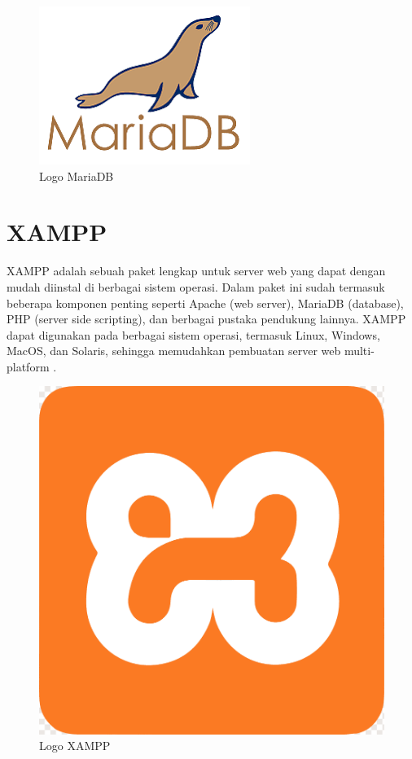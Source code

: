 \begin{figure}
	\centering
	\includegraphics[width=0.20\linewidth]{konten//gambar/logo-mariadb.png}
	\caption{Logo MariaDB}
	\label{fig:enter-label}
\end{figure}

\section{XAMPP}
XAMPP adalah sebuah paket lengkap untuk server web yang dapat dengan mudah diinstal di berbagai sistem operasi. Dalam paket ini sudah termasuk beberapa komponen penting seperti Apache (web server), MariaDB (database), PHP (server side scripting), dan berbagai pustaka pendukung lainnya. XAMPP dapat digunakan pada berbagai sistem operasi, termasuk Linux, Windows, MacOS, dan Solaris, sehingga memudahkan pembuatan server web multi-platform \cite{pakpahan2020sistem}.

\begin{figure}
	\centering
	\includegraphics[width=0.20\linewidth]{konten//gambar/logo-xampp.png}
	\caption{Logo XAMPP}
	\label{fig:enter-label}
\end{figure}